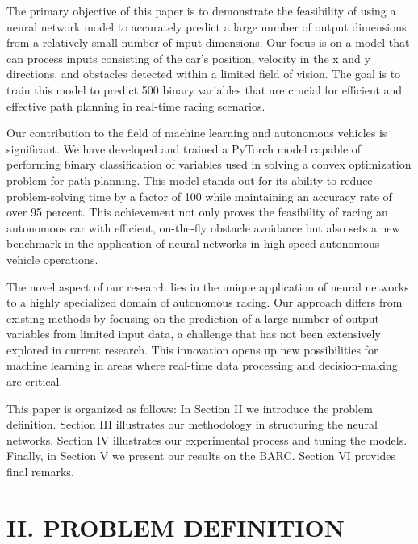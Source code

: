 \documentclass[
	letterpaper, %
	10pt, %
	unnumberedsections, %
	twoside, %
]{LTJournalArticle}
\begin{document}
The primary objective of this paper is to demonstrate the feasibility of using a neural network model to accurately predict a large number of output dimensions from a relatively small number of input dimensions. Our focus is on a model that can process inputs consisting of the car’s position, velocity in the x and y directions, and obstacles detected within a limited field of vision. The goal is to train this model to predict 500 binary variables that are crucial for efficient and effective path planning in real-time racing scenarios.

Our contribution to the field of machine learning and autonomous vehicles is significant. We have developed and trained a PyTorch model capable of performing binary classification of variables used in solving a convex optimization problem for path planning. This model stands out for its ability to reduce problem-solving time by a factor of 100 while maintaining an accuracy rate of over 95 percent. This achievement not only proves the feasibility of racing an autonomous car with efficient, on-the-fly obstacle avoidance but also sets a new benchmark in the application of neural networks in high-speed autonomous vehicle operations.

The novel aspect of our research lies in the unique application of neural networks to a highly specialized domain of autonomous racing. Our approach differs from existing methods by focusing on the prediction of a large number of output variables from limited input data, a challenge that has not been extensively explored in current research. This innovation opens up new possibilities for machine learning in areas where real-time data processing and decision-making are critical.

This paper is organized as follows: In Section II we introduce the problem definition. Section III illustrates our methodology in structuring the neural networks. Section IV illustrates our experimental process and tuning the models. Finally, in Section V we present our results on the BARC. Section VI provides final remarks.

\section{II. PROBLEM DEFINITION}
\end{document}
